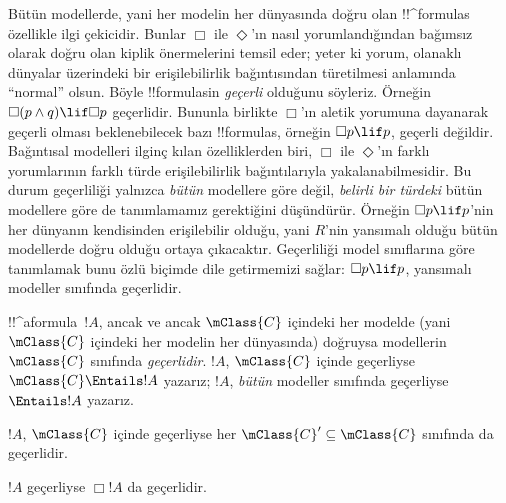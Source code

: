



\begin{explain}
  Bütün modellerde, yani her modelin her dünyasında doğru olan
  !!^{formula}s özellikle ilgi çekicidir. Bunlar $\Box$ ile $\Diamond$'ın
  nasıl yorumlandığından bağımsız olarak doğru olan kiplik önermelerini
  temsil eder; yeter ki yorum, olanaklı dünyalar üzerindeki bir
  erişilebilirlik bağıntısından türetilmesi anlamında ``normal'' olsun. Böyle
  !!{formula}s{}in \emph{geçerli} olduğunu söyleriz. Örneğin
  $\Box(p \land q) \lif \Box p$ geçerlidir. Bununla birlikte $\Box$'ın
  aletik yorumuna dayanarak geçerli olması beklenebilecek bazı !!{formula}s,
  örneğin $\Box p \lif p$, geçerli değildir. Bağıntısal modelleri ilginç
  kılan özelliklerden biri, $\Box$ ile $\Diamond$'ın farklı yorumlarının
  farklı türde erişilebilirlik bağıntılarıyla yakalanabilmesidir. Bu durum
  geçerliliği yalnızca \emph{bütün} modellere göre değil, \emph{belirli bir
  türdeki} bütün modellere göre de tanımlamamız gerektiğini düşündürür.
  Örneğin $\Box p \lif p$'nin her dünyanın kendisinden erişilebilir olduğu,
  yani $R$'nin yansımalı olduğu bütün modellerde doğru olduğu ortaya
  çıkacaktır. Geçerliliği model sınıflarına göre tanımlamak bunu özlü biçimde
  dile getirmemizi sağlar: $\Box p \lif p$, yansımalı modeller sınıfında
  geçerlidir.
\end{explain}

\begin{defn}
  !!^a{formula}~$!A$, ancak ve ancak $\mClass{C}$ içindeki her modelde
  (yani $\mClass{C}$ içindeki her modelin her dünyasında) doğruysa modellerin
  $\mClass{C}$ sınıfında \emph{geçerlidir}. $!A$, $\mClass{C}$ içinde
  geçerliyse $\mClass{C} \Entails !A$ yazarız; $!A$, \emph{bütün}
  modeller sınıfında geçerliyse $\Entails !A$ yazarız.
\end{defn}

\begin{prop}
  $!A$, $\mClass{C}$ içinde geçerliyse her
  $\mClass{C}' \subseteq \mClass{C}$ sınıfında da geçerlidir.
\end{prop}

\begin{prop}
  $!A$ geçerliyse $\Box!A$ da geçerlidir.
\end{prop}

